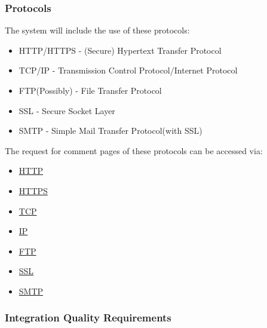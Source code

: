 \documentclass{article}
\begin{document}
			
	\pagebreak
		\subsubsection{Protocols}
		The system will include the use of these protocols:
		\begin{itemize}
			\item HTTP/HTTPS - (Secure) Hypertext Transfer Protocol
			\item TCP/IP - Transmission Control Protocol/Internet Protocol
			\item FTP(Possibly) - File Transfer Protocol
			\item SSL - Secure Socket Layer
			\item SMTP - Simple Mail Transfer Protocol(with  SSL)
		\end{itemize}
		The request for comment pages of these protocols can be accessed via:
		\begin{itemize}
			\item\href{https://tools.ietf.org/html/rfc2616}{HTTP}
			\item\href{https://tools.ietf.org/html/rfc2660}{HTTPS}
			\item\href{https://www.ietf.org/rfc/rfc793.txt}{TCP}
			\item\href{http://www.ietf.org/rfc/rfc0791.txt}{IP}
			\item\href{https://www.ietf.org/rfc/rfc959.txt}{FTP}
			\item\href{https://tools.ietf.org/html/rfc6101}{SSL}
			\item\href{https://tools.ietf.org/html/rfc821}{SMTP}
		\end{itemize}


		\subsubsection{Integration Quality Requirements}
\end{document}
